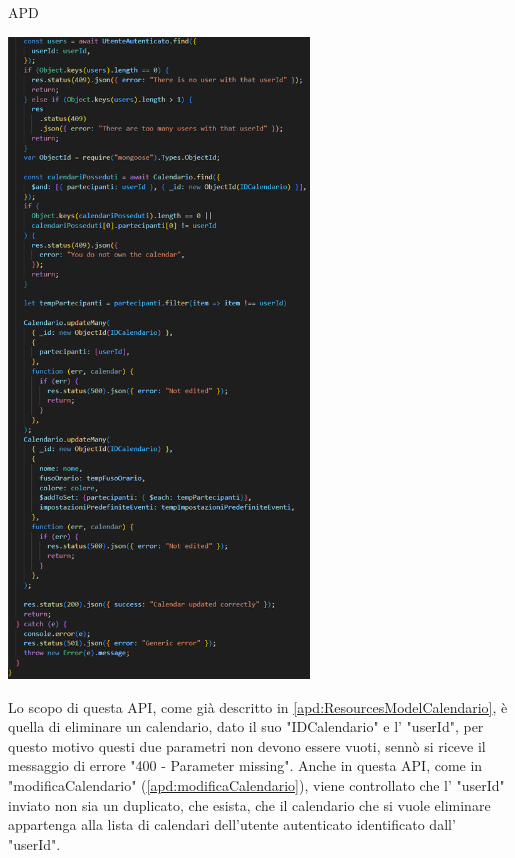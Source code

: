 \begin{listaPersonale} {APD}
\begin{listaPersonale2}[APD]{}
\begin{center}
                \end{center}
                \begin{center}
                    \includegraphics[width=0.6\textwidth, height=0.75\textheight]{img/png/APIs/modificaCalendario2.png}
                \end{center}
                Lo scopo di questa API, come già descritto in \ref{apd:ResourcesModelCalendario}, è quella di eliminare un calendario, dato il suo "IDCalendario" e l' "userId", per questo motivo questi due parametri non devono essere vuoti, sennò si riceve il messaggio di errore "400 - Parameter missing". Anche in questa API, come in "modificaCalendario" (\ref{apd:modificaCalendario}), viene controllato che l' "userId" inviato non sia un duplicato, che esista, che il calendario che si vuole eliminare appartenga alla lista di calendari dell'utente autenticato identificato dall' "userId". \\

\end{listaPersonale2}
\end{listaPersonale}
